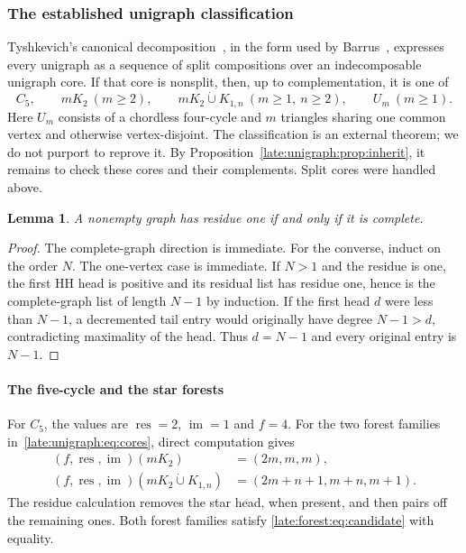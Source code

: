 \documentclass[11pt,a4paper]{article}
\newtheorem{lemma}[theorem]{Lemma}
\theoremstyle{definition}\newtheorem{definition}[theorem]{Definition}
\theoremstyle{remark}\newtheorem{remark}[theorem]{Remark}
\newcommand{\res}{\operatorname{res}}
\newcommand{\im}{\operatorname{im}}
\begin{document}
\subsubsection{The established unigraph classification}

Tyshkevich's canonical decomposition~\cite{late:unigraph:Tyshkevich}, in the form used
by Barrus~\cite[Theorems 4.1--4.2]{late:unigraph:Barrus}, expresses every unigraph as a
sequence of split compositions over an indecomposable unigraph core.
If that core is nonsplit, then, up to complementation, it is one of
\begin{equation}\label{late:unigraph:eq:cores}
C_5,\qquad mK_2\ (m\ge2),\qquad
mK_2\mathbin{\dot\cup} K_{1,n}\ (m\ge1,\ n\ge2),\qquad U_m\ (m\ge1).
\end{equation}
Here $U_m$ consists of a chordless four-cycle and $m$ triangles sharing
one common vertex and otherwise vertex-disjoint. The classification is
an external theorem; we do not purport to reprove it. By
Proposition~\ref{late:unigraph:prop:inherit}, it remains to check these cores and their
complements. Split cores were handled above.

\begin{lemma}\label{late:unigraph:lem:one}
A nonempty graph has residue one if and only if it is complete.
\end{lemma}
\begin{proof}
The complete-graph direction is immediate. For the converse, induct on
the order $N$. The one-vertex case is immediate. If $N>1$ and the residue
is one, the first HH head is positive and its residual list has residue
one, hence is the complete-graph list of length $N-1$ by induction.
If the first head $d$ were less than $N-1$, a decremented tail entry
would originally have degree $N-1>d$, contradicting maximality of the
head. Thus $d=N-1$ and every original entry is $N-1$.
\end{proof}

\paragraph{The five-cycle and the star forests}

For $C_5$, the values are $\res=2$, $\im=1$ and $f=4$.
For the two forest families in~\eqref{late:unigraph:eq:cores}, direct computation gives
\begin{align*}
(f,\res,\im)(mK_2)&=(2m,m,m),\\
(f,\res,\im)(mK_2\mathbin{\dot\cup} K_{1,n})&=(2m+n+1,m+n,m+1).
\end{align*}
The residue calculation removes the star head, when present, and then
pairs off the remaining ones. Both forest families satisfy
\eqref{late:forest:eq:candidate} with equality.
\end{document}
